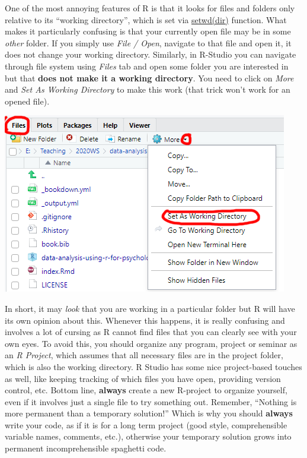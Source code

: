\documentclass[
]{book}
\begin{document}
One of the most annoying features of R is that it looks for files and folders only relative to its ``working directory'', which is set via \href{https://stat.ethz.ch/R-manual/R-devel/library/base/html/getwd.html}{setwd(dir)} function. What makes it particularly confusing is that your currently open file may be in some \emph{other} folder. If you simply use \emph{File / Open}, navigate to that file and open it, it does not change your working directory. Similarly, in R-Studio you can navigate through file system using \emph{Files} tab and open some folder you are interested in but that \textbf{does not make it a working directory}. You need to click on \emph{More} and \emph{Set As Working Directory} to make this work (that trick won't work for an opened file).

\begin{center}\includegraphics[width=1\linewidth]{images/setwd-gui} \end{center}

In short, it may \emph{look} that you are working in a particular folder but R will have its own opinion about this. Whenever this happens, it is really confusing and involves a lot of cursing as R cannot find files that you can clearly see with your own eyes. To avoid this, you should organize any program, project or seminar as an \emph{R Project}, which assumes that all necessary files are in the project folder, which is also the working directory. R Studio has some nice project-based touches as well, like keeping tracking of which files you have open, providing version control, etc. Bottom line, \textbf{always} create a new R-project to organize yourself, even if it involves just a single file to try something out. Remember, ``Nothing is more permanent than a temporary solution!'' Which is why you should \textbf{always} write your code, as if it is for a long term project (good style, comprehensible variable names, comments, etc.), otherwise your temporary solution grows into permanent incomprehensible spaghetti code.
\end{document}
